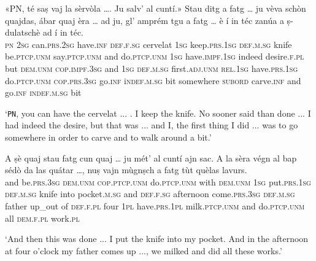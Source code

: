 \begin{linenumbers}
	\gll «PN, té saṣ vaj la sèrvòla …. Ju salv’ al cuntí.»  Stau ditg a fatg … ju vèva schòn quajdas, ábar quaj èra … ad ju,  gl’ amprém tgu a fatg … è í in téc zanúa a ṣ-dulatschè\footnotemark {} ad í in téc.   \\
	\textsc{pn} \textsc{2sg} can.\textsc{prs.2sg} have.\textsc{inf} \textsc{def.f.sg} cervelat {} \textsc{1sg} keep.\textsc{prs.1sg} \textsc{def.m.sg} knife be.\textsc{ptcp.unm} say.\textsc{ptcp.unm} and do.\textsc{ptcp.unm} {} \textsc{1sg} have.\textsc{impf.1sg} indeed desire.\textsc{f.pl} but \textsc{dem.unm} \textsc{cop.impf.3sg} {} and \textsc{1sg} \textsc{def.m.sg} first.\textsc{adj.unm} \textsc{rel.1sg} have.\textsc{prs.1sg} do.\textsc{ptcp.unm} {} \textsc{cop.prs.3sg} go.\textsc{inf} i\textsc{ndef.m.sg} bit somewhere \textsc{subord} carve.\textsc{inf} and go.\textsc{inf} \textsc{indef.m.sg} bit  \\
\end{linenumbers}
\medskip
\glt `\texttt{PN}, you can have the cervelat ... . I keep the knife. No sooner said than done ... I had indeed the desire, but that was ... and I, the first thing I did ... was to go somewhere in order to carve and to walk around a bit.'
\medskip

\begin{linenumbers}
	\gll  A ṣè quaj stau fatg cun quaj … ju mét’ al cuntí ajn sac. A la sèra végn al bap sédò da las quátar …, nuṣ vajn mùgnṣch a fatg tùt quèlas lavurs.\\
	and be.\textsc{prs.3sg} \textsc{dem.unm} \textsc{cop.ptcp.unm} do.\textsc{ptcp.unm} with \textsc{dem.unm} {} \textsc{1sg} put.\textsc{prs.1sg} \textsc{def.m.sg} knife into pocket.\textsc{m.sg} and \textsc{def.f.sg} afternoon come.\textsc{prs.3sg} \textsc{def.m.sg} father up\_out of \textsc{def.f.pl} four {} \textsc{1pl} have.\textsc{prs.1pl} milk.\textsc{ptcp.unm} and do.\textsc{ptcp.unm} all \textsc{dem.f.pl} work.\textsc{pl}   \\
\end{linenumbers}
\medskip
\glt `And then this was done ... I put the knife into my pocket. And in the afternoon at four o'clock my father comes up ..., we milked and did all these works.'
\medskip

